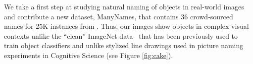 
We take a first step at studying natural naming of objects in real-world images and contribute a new dataset, ManyNames, that contains 36 crowd-sourced names for 25K instances from \vg.
Thus, our images show objects in complex visual contexts
unlike the ``clean'' ImageNet data~\cite{imagenet_cvpr09} that has been previously used to train object classifiers \cite{ILSVRC15} and unlike stylized line drawings used in picture naming experiments in Cognitive Science (see Figure \ref{fig:cake}).

